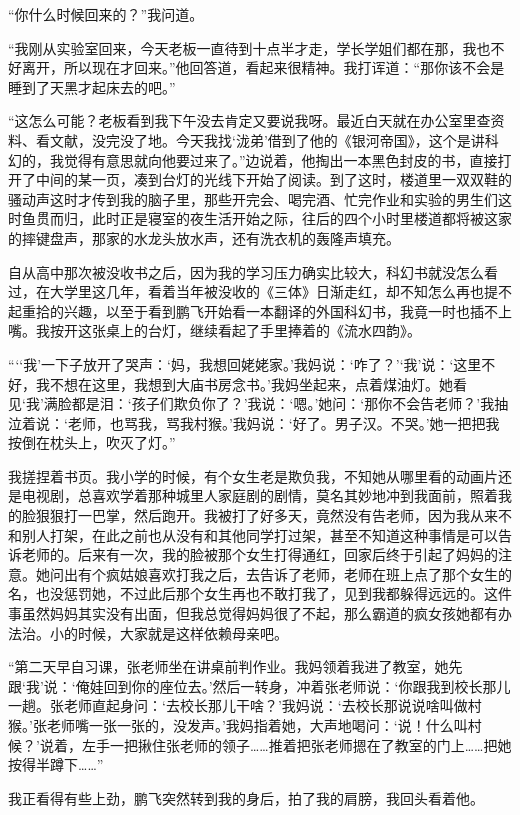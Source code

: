 \documentclass[openany,scheme = chinese, linespread = 1.5]{ctexbook}
\begin{document}
“你什么时候回来的？”我问道。

“我刚从实验室回来，今天老板一直待到十点半才走，学长学姐们都在那，我也不好离开，所以现在才回来。”他回答道，看起来很精神。我打诨道：“那你该不会是睡到了天黑才起床去的吧。”

“这怎么可能？老板看到我下午没去肯定又要说我呀。最近白天就在办公室里查资料、看文献，没完没了地。今天我找‘泷弟’借到了他的《银河帝国》，这个是讲科幻的，我觉得有意思就向他要过来了。”边说着，他掏出一本黑色封皮的书，直接打开了中间的某一页，凑到台灯的光线下开始了阅读。到了这时，楼道里一双双鞋的骚动声这时才传到我的脑子里，那些开完会、喝完酒、忙完作业和实验的男生们这时鱼贯而归，此时正是寝室的夜生活开始之际，往后的四个小时里楼道都将被这家的摔键盘声，那家的水龙头放水声，还有洗衣机的轰隆声填充。

自从高中那次被没收书之后，因为我的学习压力确实比较大，科幻书就没怎么看过，在大学里这几年，看着当年被没收的《三体》日渐走红，却不知怎么再也提不起重拾的兴趣，以至于看到鹏飞开始看一本翻译的外国科幻书，我竟一时也插不上嘴。我按开这张桌上的台灯，继续看起了手里捧着的《流水四韵》。

“‘‘我’一下子放开了哭声：‘妈，我想回姥姥家。’我妈说：‘咋了？’‘我’说：‘这里不好，我不想在这里，我想到大庙书房念书。’我妈坐起来，点着煤油灯。她看见‘我’满脸都是泪：‘孩子们欺负你了？’我说：‘嗯。’她问：‘那你不会告老师？’我抽泣着说：‘老师，也骂我，骂我村猴。’我妈说：‘好了。男子汉。不哭。’她一把把我按倒在枕头上，吹灭了灯。”

我搓捏着书页。我小学的时候，有个女生老是欺负我，不知她从哪里看的动画片还是电视剧，总喜欢学着那种城里人家庭剧的剧情，莫名其妙地冲到我面前，照着我的脸狠狠打一巴掌，然后跑开。我被打了好多天，竟然没有告老师，因为我从来不和别人打架，在此之前也从没有和其他同学打过架，甚至不知道这种事情是可以告诉老师的。后来有一次，我的脸被那个女生打得通红，回家后终于引起了妈妈的注意。她问出有个疯姑娘喜欢打我之后，去告诉了老师，老师在班上点了那个女生的名，也没惩罚她，不过此后那个女生再也不敢打我了，见到我都躲得远远的。这件事虽然妈妈其实没有出面，但我总觉得妈妈很了不起，那么霸道的疯女孩她都有办法治。小的时候，大家就是这样依赖母亲吧。

“第二天早自习课，张老师坐在讲桌前判作业。我妈领着我进了教室，她先跟‘我’说：‘俺娃回到你的座位去。’然后一转身，冲着张老师说：‘你跟我到校长那儿一趟。张老师直起身问：‘去校长那儿干啥？’我妈说：‘去校长那说说啥叫做村猴。’张老师嘴一张一张的，没发声。’我妈指着她，大声地喝问：‘说！什么叫村候？’说着，左手一把揪住张老师的领子……推着把张老师摁在了教室的门上……把她按得半蹲下……”

我正看得有些上劲，鹏飞突然转到我的身后，拍了我的肩膀，我回头看着他。
\end{document}
